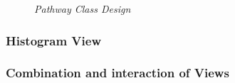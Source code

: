 \begin{figure}[ht]
\centering
{} 
\caption[Pathway Class Design]{\textit{Pathway Class Design}} 
\label{gfx:pathway_class_design}
\end{figure}

\subsubsection{Histogram View}

\subsubsection{Combination and interaction of Views}




